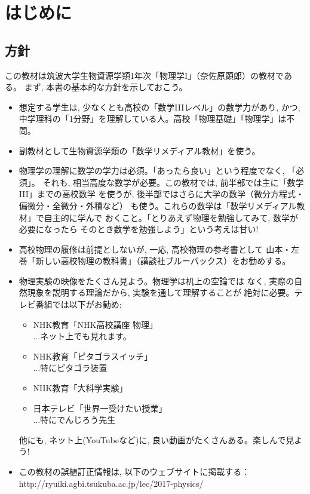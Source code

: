 \chapter{はじめに}
%
\section{方針}

この教材は筑波大学生物資源学類1年次「物理学I」（奈佐原顕郎）の教材である。
まず, 本書の基本的な方針を示しておこう。

\begin{itemize}
\item 想定する学生は, 少なくとも高校の「数学IIIレベル」の数学力があり, かつ, 
中学理科の「1分野」を理解している人。高校「物理基礎」「物理学」は不問。
\item 副教材として生物資源学類の「数学リメディアル教材」を使う。
\item 物理学の理解に数学の学力は必須。「あったら良い」という程度でなく, 「必須」。
それも, 相当高度な数学が必要。この教材では, 前半部では主に「数学III」までの高校数学
を使うが, 後半部ではさらに大学の数学（微分方程式・偏微分・全微分・外積など）
も使う。これらの数学は「数学リメディアル教材」で自主的に学んで
おくこと。「とりあえず物理を勉強してみて, 数学が必要になったら
そのとき数学を勉強しよう」という考えは甘い!
\item 高校物理の履修は前提としないが, 一応, 高校物理の参考書として
山本・左巻「新しい高校物理の教科書」（講談社ブルーバックス）をお勧めする。
\item 物理実験の映像をたくさん見よう。物理学は机上の空論では
なく, 実際の自然現象を説明する理論だから, 実験を通して理解することが
絶対に必要。テレビ番組では以下がお勧め: 
\begin{itemize}
\item NHK教育「NHK高校講座 物理」\\...ネット上でも見れます。
\item NHK教育「ピタゴラスイッチ」\\...特にピタゴラ装置
\item NHK教育「大科学実験」
\item 日本テレビ「世界一受けたい授業」\\...特にでんじろう先生
\end{itemize}
他にも, ネット上(YouTubeなど)に, 良い動画がたくさんある。楽しんで見よう!
\item この教材の誤植訂正情報は, 以下のウェブサイトに掲載する：\\
http://ryuiki.agbi.tsukuba.ac.jp/lec/2017-physics/

\end{itemize}
